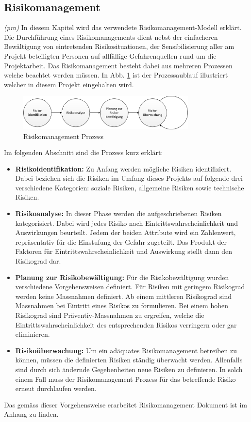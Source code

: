 \subsection{Risikomanagement}
\textit{(pro)} In diesem Kapitel wird das verwendete Risikomanagement-Modell erklärt. Die Durchführung eines Risikomanagements dient nebst der einfacheren Bewältigung von eintretenden Risikosituationen, der Sensibilisierung aller am Projekt beteiligten Personen auf allfällige Gefahrenquellen rund um die Projektarbeit. Das Risikomanagement besteht dabei aus mehreren Prozessen welche beachtet werden müssen. In Abb. \ref{fig:Risikomanagement} ist der Prozessaublauf illustriert welcher in diesem Projekt eingehalten wird.

\begin{figure}[H]
	\includegraphics[draft=false,width=0.8\textwidth]{Illustrationen/2-Methodik/Risikomanagement.png}
	\caption{Risikomanagement Prozess}
	\label{fig:Risikomanagement}
\end{figure}

Im folgenden Abschnitt sind die Prozess kurz erklärt:

\begin{itemize}
	\item \textbf{Risikoidentifikation:} Zu Anfang werden mögliche Risiken identifiziert. Dabei beziehen sich die Risiken im Umfang dieses Projekts auf folgende drei verschiedene Kategorien: soziale Risiken, allgemeine Risiken sowie technische Risiken.
	\item \textbf{Risikoanalyse:} In dieser Phase werden die aufgeschriebenen Risiken kategorisiert. Dabei wird jedes Risiko nach Eintrittswahrscheinlichkeit und Auswirkungen beurteilt. Jedem der beiden Attribute wird ein Zahlenwert, repräsentativ für die Einstufung der Gefahr zugeteilt. Das Produkt der Faktoren für Eintrittswahrscheinlichkeit und Auswirkung stellt dann den Risikograd dar.
	\item \textbf{Planung zur Risikobewältigung:} Für die Risikobewältigung wurden verschiedene Vorgehensweisen definiert. Für Risiken mit geringem Risikograd werden keine Massnahmen definiert. Ab einem mittleren Risikograd sind Massnahmen bei Eintritt eines Risikos zu formulieren. Bei einem hohen Risikograd sind Präventiv-Massnahmen zu ergreifen, welche die Eintrittswahrscheinlichkeit des entsprechenden Risikos verringern oder gar eliminieren.
	\item \textbf{Risikoüberwachung:} Um ein adäquates Risikomanagement betreiben zu können, müssen die definierten Risiken ständig überwacht werden. Allenfalls sind durch sich ändernde Gegebenheiten neue Risiken zu definieren. In solch einem Fall muss der Risikomanagement Prozess für das betreffende Risiko erneut durchlaufen werden.
\end{itemize}

Das gemäss dieser Vorgehensweise erarbeitet Risikomanagement Dokument ist im Anhang zu finden.